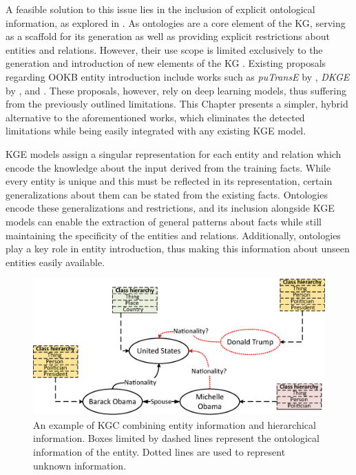A feasible solution to this issue lies in the inclusion of explicit ontological information, as explored in \cite{Patrick}. As ontologies are a core element of the KG, serving as a scaffold for its generation as well as providing explicit restrictions about entities and relations. However, their use scope is limited exclusively to the generation and introduction of new elements of the KG \citep{paulheim2017knowledge}. Existing proposals regarding OOKB entity introduction include works such as \textit{puTransE} by \cite{putranse}, \textit{DKGE} by \cite{dkge}, \cite{hamaguchi_etal} and \cite{shah_open-world_2019}. These proposals, however, rely on deep learning models, thus suffering from the previously outlined limitations. This Chapter presents a simpler, hybrid alternative to the aforementioned works, which eliminates the detected limitations while being easily integrated with any existing KGE model.


KGE models assign a singular representation for each entity and relation which encode the knowledge about the input derived from the training facts. While every entity is unique and this must be reflected in its representation, certain generalizations about them can be stated from the existing facts. Ontologies encode these generalizations and restrictions, and its inclusion alongside KGE models can enable the extraction of general patterns about facts while still maintaining the specificity of the entities and relations. Additionally, ontologies play a key role in entity introduction, thus making this information about unseen entities easily available.

\begin{figure}
    \centering
    \includegraphics[width=.8\linewidth]{4_kbsintegrationdl/figures/KGCexample.eps}
    \caption{An example of KGC combining entity information and hierarchical information. Boxes limited by dashed lines represent the ontological information of the entity. Dotted lines are used to represent unknown information.}
    \label{fig:kgc_onto_example}
\end{figure}

